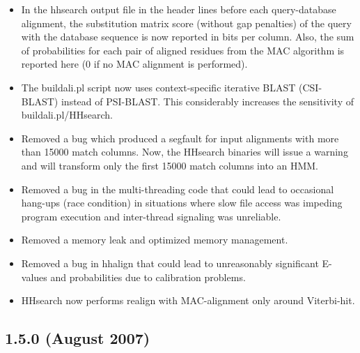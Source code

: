\documentclass[11pt,a4paper]{article}
\begin{document}
\begin{itemize}
\item{In the hhsearch output file in the header lines before each query-database 
  alignment, the substitution matrix score (without gap penalties) of the query 
  with the database sequence is now reported in bits per column. Also, the sum
  of probabilities for each pair of aligned residues from the MAC algorithm 
  is reported here (0 if no MAC alignment is performed).
}

\item{The buildali.pl script now uses context-specific iterative BLAST (CSI-BLAST) 
  instead of PSI-BLAST. This considerably increases the sensitivity of 
  buildali.pl/HHsearch. 
}

\item{Removed a bug which produced a segfault for input alignments with more than
  15000 match columns. Now, the HHsearch binaries will issue a warning and 
  will transform only the first 15000 match columns into an HMM.
}

\item{Removed a bug in the multi-threading code that could lead to occasional 
  hang-ups (race condition) in situations where slow file access was impeding 
  program execution and inter-thread signaling was unreliable.
}

\item{Removed a memory leak and optimized memory management.
}

\item{Removed a bug in hhalign that could lead to unreasonably significant E-values 
  and probabilities due to calibration problems.
}

\item{HHsearch now performs realign with MAC-alignment only around Viterbi-hit.
}

\end{itemize}

\subsection{1.5.0 (August 2007)}
\end{document}
